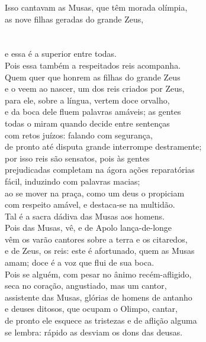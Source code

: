\begin{pages}
\begin{Rightside}
\quad{}Isso cantavam as Musas, que têm morada olímpia, \\
as nove filhas geradas do grande Zeus,\\
   \\
   \\
e  essa é a superior entre todas.\\
Pois essa também a respeitados reis acompanha. \\
Quem quer que honrem as filhas do grande Zeus\\
e o veem ao nascer, um dos reis criados por Zeus,\\
para ele, sobre a língua, vertem doce orvalho,\\
e da boca dele fluem palavras amáveis; as gentes\\
todas o miram quando decide entre sentenças \\
com retos juízos: falando com segurança,\\
de pronto até disputa grande interrompe destramente;\\
por isso reis são sensatos, pois às gentes\\
prejudicadas completam na ágora ações reparatórias\\
fácil, induzindo com palavras macias; \\
ao se mover na praça, como um deus o propiciam\\
com respeito amável, e destaca-se na multidão.\\

\quad{}Tal é a sacra dádiva das Musas aos homens.\\
Pois das Musas, vê, e de Apolo lança-de-longe\\
vêm os varão cantores sobre a terra e os citaredos, \\
e de Zeus, os reis: este é afortunado, quem as Musas\\
amam; doce é a voz que flui de sua boca.\\
Pois se alguém, com pesar no ânimo recém-afligido,\\
seca no coração, angustiado, mas um cantor,\\
assistente das Musas, glórias de homens de antanho \\
e deuses ditosos, que ocupam o Olimpo, cantar,\\
de pronto ele esquece as tristezas e de aflição alguma\\
se lembra: rápido as desviam os dons das deusas.\\


\end{Rightside}
\end{pages}
